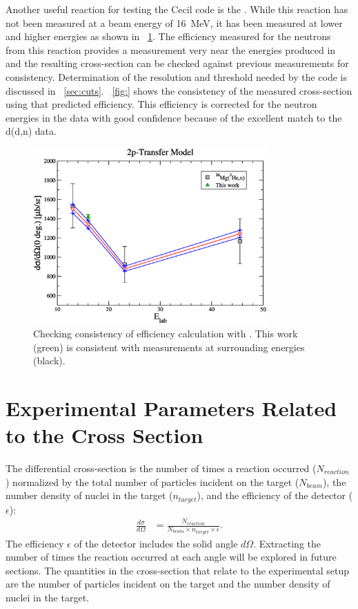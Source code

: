 Another useful reaction for testing the Cecil code is the \MgReaction.  While this reaction has not been measured at a beam energy of 16~MeV, it has been measured at lower and higher energies as shown in {\fig}~\ref{fig:efficiencyCalib}.  The efficiency measured for the neutrons from this reaction provides a measurement very near the energies produced in \reaction and the resulting cross-section can be checked against previous measurements for consistency.  Determination of the resolution and threshold needed by the code is discussed in {\sect}~\ref{sec:cuts}.  {\fig}~\ref{fig:} shows the consistency of the measured cross-section using that predicted efficiency.  This efficiency is corrected for the neutron energies in the \reaction data with good confidence because of the excellent match to the d(d,n) data.
\begin{figure}[!htbp]
\centering
\includegraphics[width=0.8\textwidth]{figures/magnesiumMatch.eps}
\caption{Checking consistency of efficiency calculation with \MgReaction.  This work (green) is consistent with measurements at surrounding energies (black).}
\label{fig:efficiencyCalib}
\end{figure}

\section{Experimental Parameters Related to the Cross Section}

The differential cross-section is the number of times a reaction occurred ($N_{reaction}$) normalized by the total number of particles incident on the target ($N_{beam}$), the number density of nuclei in the target ($n_{target}$), and the efficiency of the detector ($\epsilon$):
\begin{align}
\frac{d\sigma}{d\Omega} &= \frac{N_{reaction}}{N_{beam} \times n_{target} \times \epsilon}.
\label{eq:cross_section}
\end{align}
The efficiency $\epsilon$ of the detector includes the solid angle $d\Omega$.  Extracting the number of times the reaction occurred at each angle will be explored in future sections.  The quantities in the cross-section that relate to the experimental setup are the number of particles incident on the target and the number density of nuclei in the target.

